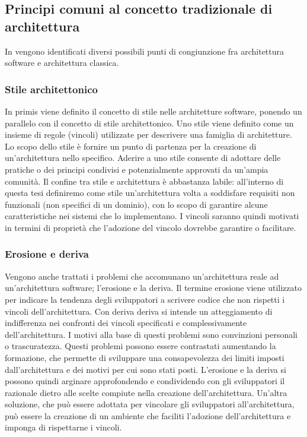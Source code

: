 \documentclass[12pt]{report}
\begin{document}
\subsection{Principi comuni al concetto tradizionale di architettura}
In \cite{perry_foundations_1992} vengono identificati diversi possibili punti di congiunzione fra architettura software e architettura classica.
\subsubsection{Stile architettonico}\label{stile architettonico}
In primis viene definito il concetto di stile nelle architetture software, ponendo un parallelo con il concetto di stile architettonico. 
Uno stile viene definito come un insieme di regole (vincoli) utilizzate per descrivere una famiglia di architetture. 
Lo scopo dello stile è fornire un punto di partenza per la creazione di un'architettura nello specifico.
Aderire a uno stile consente di adottare delle pratiche o dei principi condivisi e potenzialmente approvati da un'ampia comunità. 
Il confine tra stile e architettura è abbastanza labile: all'interno di questa tesi definiremo come stile un'architettura volta a soddisfare requisiti non funzionali (non specifici di un dominio), con lo scopo di garantire alcune caratteristiche nei sistemi che lo implementano. 
I vincoli saranno quindi motivati in termini di proprietà che l'adozione del vincolo dovrebbe garantire o facilitare.
\subsubsection{Erosione e deriva}\label{erosione e deriva}

Vengono anche trattati i problemi che accomunano un'architettura reale ad un'architettura software; l'erosione e la deriva.
Il termine erosione viene utilizzato per indicare la tendenza degli sviluppatori a scrivere codice che non rispetti i vincoli dell'architettura.
Con deriva deriva si intende un atteggiamento di indifferenza nei confronti dei vincoli specificati e complessivamente dell'architettura.
I motivi alla base di questi problemi sono convinzioni personali o trascuratezza.
Questi problemi possono essere contrastati aumentando la formazione, che permette di sviluppare una consapevolezza dei limiti imposti dall'architettura e dei motivi per cui sono stati posti.
L'erosione e la deriva si possono quindi arginare approfondendo e condividendo con gli sviluppatori il razionale dietro alle scelte compiute nella creazione dell'architettura.
Un'altra soluzione, che può essere adottata per vincolare gli sviluppatori all'architettura, può essere la creazione di un ambiente che faciliti l'adozione dell'architettura e imponga di rispettarne i vincoli.
\end{document}
